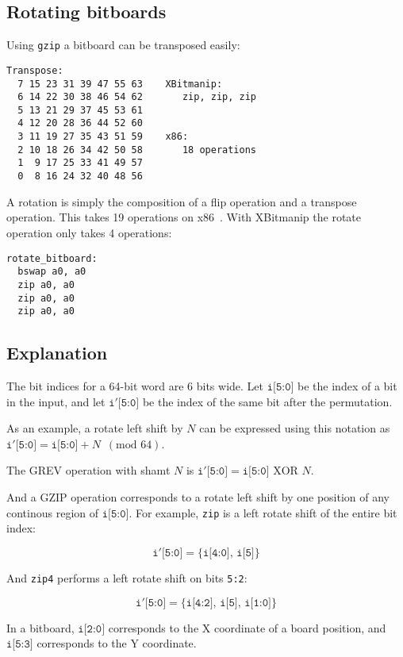 \subsection{Rotating bitboards}

Using {\tt gzip} a bitboard can be transposed easily:

\begin{verbatim}
Transpose:
  7 15 23 31 39 47 55 63    XBitmanip:
  6 14 22 30 38 46 54 62       zip, zip, zip
  5 13 21 29 37 45 53 61
  4 12 20 28 36 44 52 60
  3 11 19 27 35 43 51 59    x86:
  2 10 18 26 34 42 50 58       18 operations
  1  9 17 25 33 41 49 57
  0  8 16 24 32 40 48 56
\end{verbatim}

A rotation is simply the composition of a flip operation and a transpose
operation. This takes 19 operations on x86~\cite{ChessProg}. With XBitmanip
the rotate operation only takes 4 operations:

\begin{verbatim}
rotate_bitboard:
  bswap a0, a0
  zip a0, a0
  zip a0, a0
  zip a0, a0
\end{verbatim}

\subsection{Explanation}

The bit indices for a 64-bit word are 6 bits wide. Let $\texttt{i[5:0]}$ be the
index of a bit in the input, and let $\texttt{i$'$[5:0]}$ be the index of the
same bit after the permutation.

As an example, a rotate left shift by $N$ can be expressed using this notation
as $\texttt{i$'$[5:0]} = \texttt{i[5:0]} + N \,\,\, (\textrm{mod 64})$.

The GREV operation with shamt $N$ is $\texttt{i$'$[5:0]} = \texttt{i[5:0]} \textrm{ XOR } N$.

And a GZIP operation corresponds to a rotate left shift by one position of any
continous region of $\texttt{i[5:0]}$. For example, {\tt zip} is a left rotate shift
of the entire bit index:

$$\texttt{i$'$[5:0]} = \{ \texttt{i[4:0]},\, \texttt{i[5]} \}$$

And {\tt zip4} performs a left rotate shift on bits {\tt 5:2}:

$$\texttt{i$'$[5:0]} = \{ \texttt{i[4:2]},\, \texttt{i[5]},\, \texttt{i[1:0]} \}$$

In a bitboard, $\texttt{i[2:0]}$ corresponds to the X coordinate of a board position, and
$\texttt{i[5:3]}$ corresponds to the Y coordinate.

